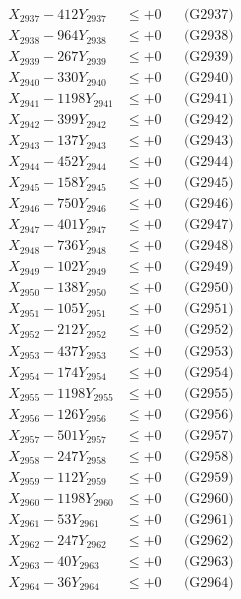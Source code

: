 \documentclass[a4paper,10pt]{article}
\begin{document}
{\begin{align}
X_{2937} - 412Y_{2937} &\leq +0 && \text{(G2937)} \\
X_{2938} - 964Y_{2938} &\leq +0 && \text{(G2938)} \\
X_{2939} - 267Y_{2939} &\leq +0 && \text{(G2939)} \\
X_{2940} - 330Y_{2940} &\leq +0 && \text{(G2940)} \\
\allowbreak
X_{2941} - 1198Y_{2941} &\leq +0 && \text{(G2941)} \\
X_{2942} - 399Y_{2942} &\leq +0 && \text{(G2942)} \\
X_{2943} - 137Y_{2943} &\leq +0 && \text{(G2943)} \\
X_{2944} - 452Y_{2944} &\leq +0 && \text{(G2944)} \\
X_{2945} - 158Y_{2945} &\leq +0 && \text{(G2945)} \\
X_{2946} - 750Y_{2946} &\leq +0 && \text{(G2946)} \\
X_{2947} - 401Y_{2947} &\leq +0 && \text{(G2947)} \\
X_{2948} - 736Y_{2948} &\leq +0 && \text{(G2948)} \\
X_{2949} - 102Y_{2949} &\leq +0 && \text{(G2949)} \\
X_{2950} - 138Y_{2950} &\leq +0 && \text{(G2950)} \\
\allowbreak
X_{2951} - 105Y_{2951} &\leq +0 && \text{(G2951)} \\
X_{2952} - 212Y_{2952} &\leq +0 && \text{(G2952)} \\
X_{2953} - 437Y_{2953} &\leq +0 && \text{(G2953)} \\
X_{2954} - 174Y_{2954} &\leq +0 && \text{(G2954)} \\
X_{2955} - 1198Y_{2955} &\leq +0 && \text{(G2955)} \\
X_{2956} - 126Y_{2956} &\leq +0 && \text{(G2956)} \\
X_{2957} - 501Y_{2957} &\leq +0 && \text{(G2957)} \\
X_{2958} - 247Y_{2958} &\leq +0 && \text{(G2958)} \\
X_{2959} - 112Y_{2959} &\leq +0 && \text{(G2959)} \\
X_{2960} - 1198Y_{2960} &\leq +0 && \text{(G2960)} \\
\allowbreak
X_{2961} - 53Y_{2961} &\leq +0 && \text{(G2961)} \\
X_{2962} - 247Y_{2962} &\leq +0 && \text{(G2962)} \\
X_{2963} - 40Y_{2963} &\leq +0 && \text{(G2963)} \\
X_{2964} - 36Y_{2964} &\leq +0 && \text{(G2964)} \\

\end{align}}
\end{document}
